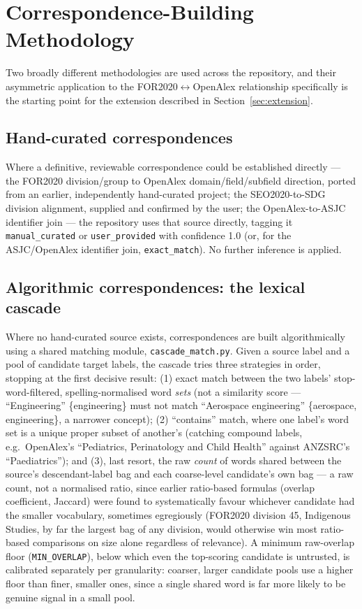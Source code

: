 \documentclass[11pt]{article}
\begin{document}
\section{Correspondence-Building Methodology}
\label{sec:methodology}

Two broadly different methodologies are used across the repository, and their asymmetric
application to the FOR2020$\leftrightarrow$OpenAlex relationship specifically is the
starting point for the extension described in Section~\ref{sec:extension}.

\subsection{Hand-curated correspondences}

Where a definitive, reviewable correspondence could be established directly --- the
FOR2020 division/group to OpenAlex domain/field/subfield direction, ported from an
earlier, independently hand-curated project; the SEO2020-to-SDG division alignment,
supplied and confirmed by the user; the OpenAlex-to-ASJC identifier join --- the
repository uses that source directly, tagging it \texttt{manual\_curated} or
\texttt{user\_provided} with confidence 1.0 (or, for the ASJC/OpenAlex identifier join,
\texttt{exact\_match}). No further inference is applied.

\subsection{Algorithmic correspondences: the lexical cascade}

Where no hand-curated source exists, correspondences are built algorithmically using a
shared matching module, \texttt{cascade\_match.py}. Given a source label and a pool of
candidate target labels, the cascade tries three strategies in order, stopping at the
first decisive result: (1) exact match between the two labels' stop-word-filtered,
spelling-normalised word \emph{sets} (not a similarity score --- ``Engineering''
\{engineering\} must not match ``Aerospace engineering'' \{aerospace, engineering\}, a
narrower concept); (2) ``contains'' match, where one label's word set is a unique proper
subset of another's (catching compound labels, e.g.\ OpenAlex's ``Pediatrics,
Perinatology and Child Health'' against ANZSRC's ``Paediatrics''); and (3), last resort,
the raw \emph{count} of words shared between the source's descendant-label bag and each
coarse-level candidate's own bag --- a raw count, not a normalised ratio, since earlier
ratio-based formulas (overlap coefficient, Jaccard) were found to systematically favour
whichever candidate had the smaller vocabulary, sometimes egregiously (FOR2020 division
45, Indigenous Studies, by far the largest bag of any division, would otherwise win most
ratio-based comparisons on size alone regardless of relevance). A minimum raw-overlap
floor (\texttt{MIN\_OVERLAP}), below which even the top-scoring candidate is untrusted,
is calibrated separately per granularity: coarser, larger candidate pools use a higher
floor than finer, smaller ones, since a single shared word is far more likely to be
genuine signal in a small pool.
\end{document}
